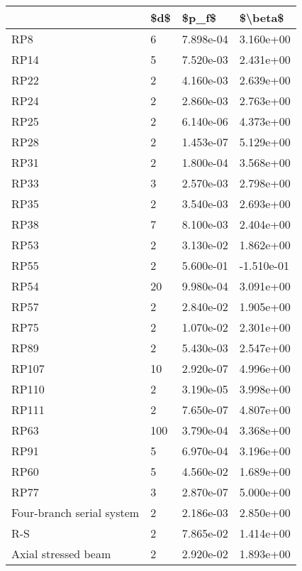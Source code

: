 \begin{tabular}{llll}
\toprule
{} &  \$d\$ &     \$p\_f\$ &    \$\textbackslash beta\$ \\
\midrule
RP8                       &    6 & 7.898e-04 &  3.160e+00 \\
RP14                      &    5 & 7.520e-03 &  2.431e+00 \\
RP22                      &    2 & 4.160e-03 &  2.639e+00 \\
RP24                      &    2 & 2.860e-03 &  2.763e+00 \\
RP25                      &    2 & 6.140e-06 &  4.373e+00 \\
RP28                      &    2 & 1.453e-07 &  5.129e+00 \\
RP31                      &    2 & 1.800e-04 &  3.568e+00 \\
RP33                      &    3 & 2.570e-03 &  2.798e+00 \\
RP35                      &    2 & 3.540e-03 &  2.693e+00 \\
RP38                      &    7 & 8.100e-03 &  2.404e+00 \\
RP53                      &    2 & 3.130e-02 &  1.862e+00 \\
RP55                      &    2 & 5.600e-01 & -1.510e-01 \\
RP54                      &   20 & 9.980e-04 &  3.091e+00 \\
RP57                      &    2 & 2.840e-02 &  1.905e+00 \\
RP75                      &    2 & 1.070e-02 &  2.301e+00 \\
RP89                      &    2 & 5.430e-03 &  2.547e+00 \\
RP107                     &   10 & 2.920e-07 &  4.996e+00 \\
RP110                     &    2 & 3.190e-05 &  3.998e+00 \\
RP111                     &    2 & 7.650e-07 &  4.807e+00 \\
RP63                      &  100 & 3.790e-04 &  3.368e+00 \\
RP91                      &    5 & 6.970e-04 &  3.196e+00 \\
RP60                      &    5 & 4.560e-02 &  1.689e+00 \\
RP77                      &    3 & 2.870e-07 &  5.000e+00 \\
Four-branch serial system &    2 & 2.186e-03 &  2.850e+00 \\
R-S                       &    2 & 7.865e-02 &  1.414e+00 \\
Axial stressed beam       &    2 & 2.920e-02 &  1.893e+00 \\
\bottomrule
\end{tabular}

